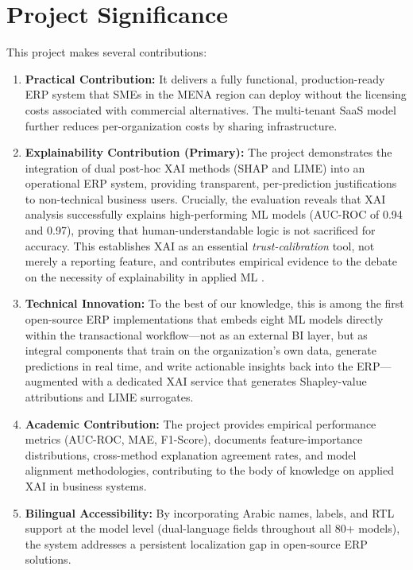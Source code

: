 \documentclass[12pt,a4paper]{report}
\begin{document}
\section{Project Significance}
\label{sec:significance}

This project makes several contributions:

\begin{enumerate}[label=\arabic*.]
  \item \textbf{Practical Contribution:} It delivers a fully functional, production-ready ERP system that SMEs in the MENA region can deploy without the licensing costs associated with commercial alternatives. The multi-tenant SaaS model further reduces per-organization costs by sharing infrastructure.

  \item \textbf{Explainability Contribution (Primary):} The project demonstrates the integration of dual post-hoc XAI methods (SHAP and LIME) into an operational ERP system, providing transparent, per-prediction justifications to non-technical business users. Crucially, the evaluation reveals that XAI analysis successfully explains high-performing ML models (AUC-ROC of 0.94 and 0.97), proving that human-understandable logic is not sacrificed for accuracy. This establishes XAI as an essential \textit{trust-calibration} tool, not merely a reporting feature, and contributes empirical evidence to the debate on the necessity of explainability in applied ML \citep{rudin2019stop}.

  \item \textbf{Technical Innovation:} To the best of our knowledge, this is among the first open-source ERP implementations that embeds eight ML models directly within the transactional workflow---not as an external BI layer, but as integral components that train on the organization's own data, generate predictions in real time, and write actionable insights back into the ERP---augmented with a dedicated XAI service that generates Shapley-value attributions and LIME surrogates.

  \item \textbf{Academic Contribution:} The project provides empirical performance metrics (AUC-ROC, MAE, F1-Score), documents feature-importance distributions, cross-method explanation agreement rates, and model alignment methodologies, contributing to the body of knowledge on applied XAI in business systems.

  \item \textbf{Bilingual Accessibility:} By incorporating Arabic names, labels, and RTL support at the model level (dual-language fields throughout all 80+ models), the system addresses a persistent localization gap in open-source ERP solutions.
\end{enumerate}
\end{document}
